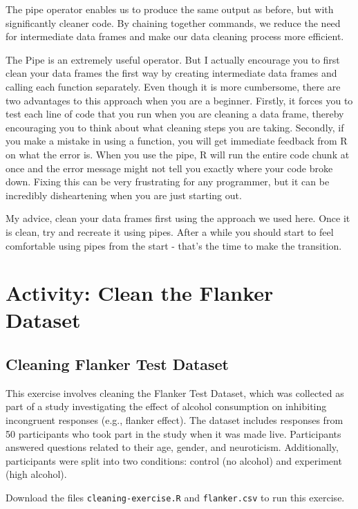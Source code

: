 \documentclass[
]{book}
\begin{document}
The pipe operator enables us to produce the same output as before, but with significantly cleaner code. By chaining together commands, we reduce the need for intermediate data frames and make our data cleaning process more efficient.

The Pipe is an extremely useful operator. But I actually encourage you to first clean your data frames the first way by creating intermediate data frames and calling each function separately. Even though it is more cumbersome, there are two advantages to this approach when you are a beginner. Firstly, it forces you to test each line of code that you run when you are cleaning a data frame, thereby encouraging you to think about what cleaning steps you are taking. Secondly, if you make a mistake in using a function, you will get immediate feedback from R on what the error is. When you use the pipe, R will run the entire code chunk at once and the error message might not tell you exactly where your code broke down. Fixing this can be very frustrating for any programmer, but it can be incredibly disheartening when you are just starting out.

My advice, clean your data frames first using the approach we used here. Once it is clean, try and recreate it using pipes. After a while you should start to feel comfortable using pipes from the start - that's the time to make the transition.

\section{Activity: Clean the Flanker Dataset}\label{clean-activity}

\subsection{\texorpdfstring{\textbf{Cleaning Flanker Test Dataset}}{Cleaning Flanker Test Dataset}}\label{cleaning-flanker-test-dataset}

This exercise involves cleaning the Flanker Test Dataset, which was collected as part of a study investigating the effect of alcohol consumption on inhibiting incongruent responses (e.g., flanker effect). The dataset includes responses from 50 participants who took part in the study when it was made live. Participants answered questions related to their age, gender, and neuroticism. Additionally, participants were split into two conditions: control (no alcohol) and experiment (high alcohol).

Download the files \texttt{cleaning-exercise.R} and \texttt{flanker.csv} to run this exercise.
\end{document}
